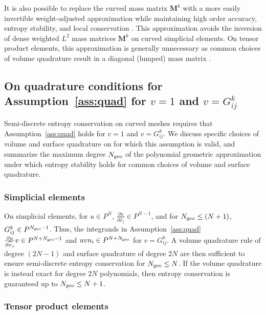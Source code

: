 \documentclass{svjour3}                     %
\renewcommand{\hat}{\widehat}
\newcommand{\pd}[2]{\frac{\partial#1}{\partial#2}}
\renewcommand{\note}[1]{{\color{blue}{#1}}}
\begin{document}
\begin{remark}
It is also possible to replace the curved mass matrix $\bm{M}^k$ with a more easily invertible weight-adjusted approximation while maintaining high order accuracy, entropy stability, and local conservation \cite{chan2018discretely}.  This approximation avoids the inversion of dense weighted $L^2$ mass matrices $\bm{M}^k$ on curved simplicial elements.  On tensor product elements, this approximation is generally unnecessary as common choices of volume quadrature result in a diagonal (lumped) mass matrix \cite{carpenter2014entropy, parsani2016entropy, chan2018efficient}.
\end{remark}

\subsection{On quadrature conditions for Assumption~\ref{ass:quad} for $v = 1$ and $v = G^k_{ij}$}

Semi-discrete entropy conservation on curved meshes requires that Assumption~\ref{ass:quad} holds for $v = 1$ and $v = G^k_{ij}$.  We discuss specific choices of volume and surface quadrature on for which this assumption is valid, and summarize the maximum degree $N_{\rm geo}$ of the polynomial geometric approximation under which entropy stability holds for common choices of volume and surface quadrature.  

\subsubsection{Simplicial elements} 

On simplicial elements, for $u \in P^N$, $\pd{u}{\hat{x}_j}\in P^{N-1}$, and for $N_{\rm geo}\leq (N+1)$, $G^k_{ij}\in P^{N_{\rm geo}-1}$.  Thus, the integrands in Assumption~\ref{ass:quad} $\pd{u}{\hat{x}_j} v \in P^{N+N_{\rm geo}-1}$ and $uv n_i \in P^{N+N_{\rm geo}}$ for $v = G^k_{ij}$.  A volume quadrature rule of degree $(2N-1)$ and surface quadrature of degree $2N$ are then sufficient to ensure semi-discrete entropy conservation for $N_{\rm geo}\leq N$.  If the volume quadrature is instead exact for degree $2N$ polynomials, then entropy conservation is guaranteed up to $N_{\rm geo} \leq N+1$.

\subsubsection{Tensor product elements} 
\end{document}
